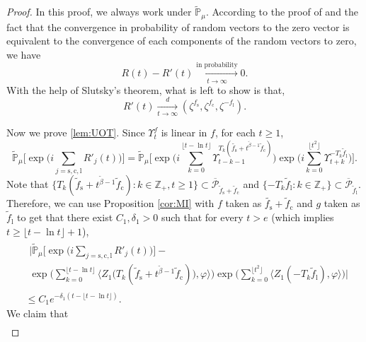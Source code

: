 \documentclass[12pt,a4paper]{amsart}
\theoremstyle{plain}
\theoremstyle{definition}
\numberwithin{equation}{section}
\begin{document}
\begin{proof}
	In this proof, we always work under $\mathbb{\widetilde{P}}_{\mu}$.
	According to the proof of 
\cite[Theorem 1.6]{RenSongSunZhao2019Stable} and the fact that the convergence in
 probability of random vectors to the zero vector is equivalent to the convergence of each components of the random vectors to zero, we have
\[
	R(t)-R'(t)
	\xrightarrow[t\to \infty]{\text{in probability}} 0.
\]
	With the help of Slutsky's theorem, what is left to show is that,
\begin{equation} \label{lem:UOT}
	R'(t)
	\xrightarrow[t\to \infty]{d}(\zeta^{f_\mathrm s},\zeta^{f_\mathrm c},\zeta^{-f_\mathrm l}).
\end{equation}

	Now we prove \eqref{lem:UOT}.
	Since $\Upsilon_t^f$ is linear in $f$, for each $t\geq 1$,
\[
        \widetilde{\mathbb P}_{\mu}\Big[\exp\Big(i \sum_{j=\mathrm s,\mathrm c,\mathrm l} R'_j(t)\Big)\Big]
	= \widetilde{\mathbb P}_{\mu}\Big[\exp\Big(i\sum_{k=0}^{\lfloor t-\ln t \rfloor}\Upsilon_{t-k-1}^{T_k(\tilde{f_\mathrm s}+t^{\tilde{\beta}-1} \tilde{f}_{\mathrm c})}\Big)\exp\Big(i\sum_{k=0}^{\lfloor t^2 \rfloor}\Upsilon_{t+k}^{-T_k\tilde{f}_{\mathrm l}}\Big)\Big].
\]
	Note that $\{T_k(\tilde f_\mathrm s + t^{\tilde\beta - 1}\tilde f_{\mathrm c}):k\in \mathbb Z_+, t\geq 1\}\subset \overline{\mathcal P}_{\tilde f_\mathrm s + \tilde f_{\mathrm c}}$ and $\{-T_k\tilde{f}_{\mathrm l}: k\in \mathbb Z_+\}\subset \overline{\mathcal P}_{\tilde f_\mathrm l}$.
	Therefore, we can use Proposition \ref{cor:MI} with $f$ 
taken as $\tilde{f_\mathrm s}+ \tilde{f}_{\mathrm c}$ and $g$ taken as
	$\tilde{f}_{\mathrm l}$
	to get that there exist $C_1,\delta_1 > 0$ such that for every $t>e$ (which implies $t\geq \lfloor t - \ln t\rfloor +1$),
\begin{align}
       &\begin{multlined}
  	\bigg|\widetilde{\mathbb P}_{\mu}\Big[\exp\Big(i \sum_{j=\mathrm s,\mathrm c,\mathrm l}R'_j(t)\Big)\Big] - {}
  	\\ \exp\Big(\sum_{k=0}^{\lfloor t-\ln t \rfloor} \big\langle Z_1\big(T_{k}(\tilde f_\mathrm s+t^{\tilde{\beta}-1}\tilde{f}_{\mathrm c})\big), \varphi \big\rangle \Big)\exp\Big(\sum_{k=0}^{\lfloor t^2 \rfloor}\langle Z_1(-T_k\tilde{f}_{\mathrm l}),\varphi\rangle\Big)\bigg|
  	\end{multlined}
      \\ &\leq C_1 e^{-\delta_1(t - \lfloor t - \ln t\rfloor)}.
\end{align}
	We claim that
\begin{align}

\end{align}
\end{proof}
\end{document}
